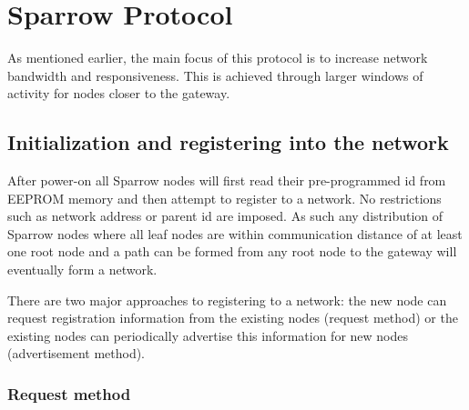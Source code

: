 
\chapter{Sparrow Protocol}

As mentioned earlier, the main focus of this protocol is to increase network
bandwidth and responsiveness. This is achieved through larger windows of
activity for nodes closer to the gateway. 

\section{Initialization and registering into the network}

After power-on all Sparrow nodes will first read their pre-programmed id from
\mbox{EEPROM} memory and then attempt to register to a network. No restrictions
such as network address or parent id are imposed. As such any distribution of
Sparrow nodes where all leaf nodes are within communication distance of at
least one root node and a path can be formed from any root node to the gateway
will eventually form a network. 

There are two major approaches to registering to a network: the new node can
request registration information from the existing nodes (request method) or
the existing nodes can periodically advertise this information for new nodes
(advertisement method). 

\subsection{Request method}

